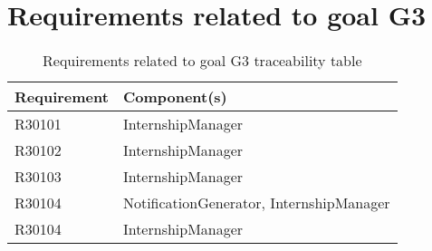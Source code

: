 	\section{Requirements related to goal G3}
			\begin{table}[H]
				\begin{tabular}{ | m{2.6cm} | m{9cm} | } 
					\hline
					\textbf {Requirement} & \textbf{Component(s)} \\
										\hline
						R30101 & InternshipManager \\
					\hline
						R30102 & InternshipManager \\
					\hline
						R30103 & InternshipManager \\
					\hline
						R30104 & NotificationGenerator, InternshipManager \\
					\hline
						R30104 & InternshipManager \\
					\hline
				\end{tabular}
				\caption{Requirements related to goal G3 traceability table}
			\end{table}